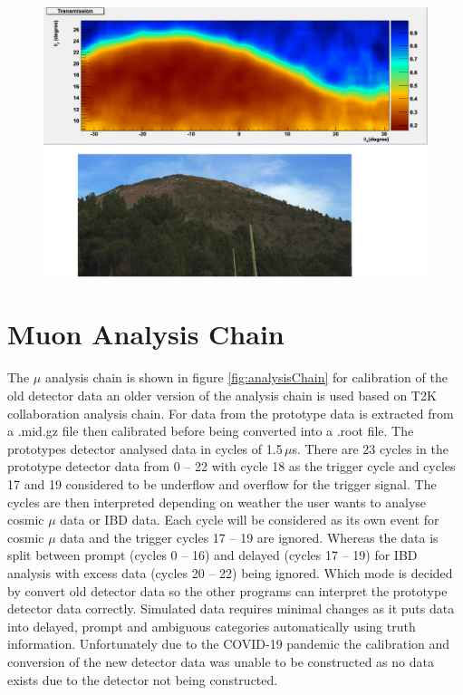 \begin{figure}[htbp]
 \centering
 \includegraphics[width=1.0\linewidth]{Chapter5/Figs/Raster/mtVesuviusMuRayTransmission.png}
 \label{fig:mtVesuviusMuRayTransmission}
\end{figure}

\section{Muon Analysis Chain}\label{sec:muonAnalysisChain}
The $\mu$ analysis chain is shown in figure \ref{fig:analysisChain} for calibration of the old detector data an older version of the analysis chain is used based on T2K collaboration analysis chain. For data from the prototype data is extracted from a .mid.gz file then calibrated before being converted into a .root file. The prototypes detector analysed data in cycles of 1.5\,$\mu$s. There are 23 cycles in the prototype detector data from 0 -- 22 with cycle 18 as the trigger cycle and cycles 17 and 19 considered to be underflow and overflow for the trigger signal. The cycles are then interpreted depending on weather the user wants to analyse cosmic $\mu$ data or IBD data. Each cycle will be considered as its own event for cosmic $\mu$ data and the trigger cycles 17 -- 19 are ignored. Whereas the data is split between prompt (cycles 0 -- 16) and delayed (cycles 17 -- 19) for IBD analysis with excess data (cycles 20 -- 22) being ignored. Which mode is decided by convert old detector data so the other programs can interpret the prototype detector data correctly. Simulated data requires minimal changes as it puts data into delayed, prompt and ambiguous categories automatically using truth information. Unfortunately due to the COVID-19 pandemic the calibration and conversion of the new detector data was unable to be constructed as no data exists due to the detector not being constructed. 
 
